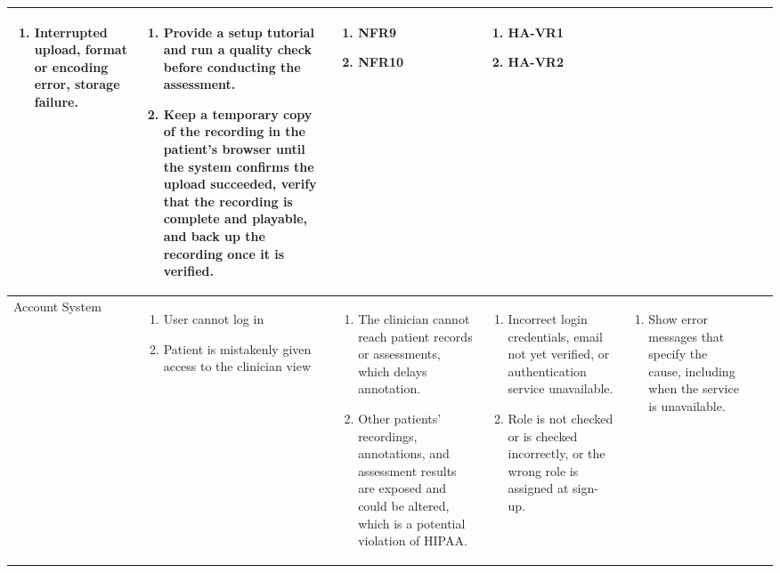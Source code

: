 \documentclass{article}
\begin{document}
\begin{landscape}
\begin{longtable}{|p{2.4cm}|p{3.2cm}|p{4cm}|p{3.6cm}|p{4.8cm}|p{1.8cm}|p{2.2cm}|}
\begin{enumerate}[leftmargin=*]
       \item Interrupted upload, format or encoding error, storage failure.
  \end{enumerate} &
  \begin{enumerate}[leftmargin=*]
       \item Provide a setup tutorial and run a quality check before conducting the assessment.
       \item Keep a temporary copy of the recording in the patient's browser until the system confirms the upload succeeded, verify that the recording is complete and playable, and back up the recording once it is verified.
  \end{enumerate} &
  \begin{enumerate}[leftmargin=*]
       \item NFR9
       \item NFR10
  \end{enumerate} &
  \begin{enumerate}[leftmargin=*]
       \item HA-VR1
       \item HA-VR2
  \end{enumerate} \\
  \hline
  Account System & 
  \begin{enumerate}[leftmargin=*]
      \item User cannot log in
      \item Patient is mistakenly given access to the clinician view
  \end{enumerate} & 
  \begin{enumerate}[leftmargin=*]
      \item The clinician cannot reach patient records or assessments, which delays annotation.
      \item Other patients' recordings, annotations, and assessment results are exposed and could be altered, which is a potential violation of HIPAA.
  \end{enumerate} &
  \begin{enumerate}[leftmargin=*]
       \item Incorrect login credentials, email not yet verified, or authentication service unavailable.
       \item Role is not checked or is checked incorrectly, or the wrong role is assigned at sign-up.
  \end{enumerate} &
  \begin{enumerate}[leftmargin=*]
       \item Show error messages that specify the cause, including when the service is unavailable.

\end{enumerate}
\end{longtable}
\end{landscape}
\end{document}
